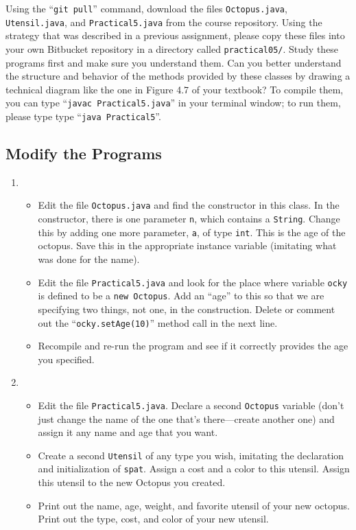 \begin{sloppypar}
Using the ``{\tt git pull}'' command, download the files {\tt Octopus.java}, {\tt Utensil.java}, and {\tt Practical5.java}
from the course repository. Using the strategy that was described in a previous assignment, please copy these files into
your own Bitbucket repository in a directory called {\tt practical05/}. Study these programs first and make sure you
understand them. Can you better understand the structure and behavior of the methods provided by these classes by
drawing a technical diagram like the one in Figure 4.7 of your textbook? To compile them, you can type ``{\tt javac
  Practical5.java}'' in your terminal window; to run them, please type type ``{\tt java Practical5}''.
\end{sloppypar}

\vspace*{-.15in}
\subsection*{Modify the Programs} 
\vspace*{-.05in}
\begin{enumerate}
\item 
\begin{itemize}
\item 
Edit the file {\tt Octopus.java} and find the constructor in this class. In the constructor,
there is one parameter {\tt n}, which contains a {\tt String}. 
Change this by adding one more parameter, {\tt a}, of type {\tt int}.
This is the age of the octopus. Save this in the appropriate instance
variable (imitating what was done for the name). 
\item 
\noindent Edit the file {\tt Practical5.java} and look for the place where variable
{\tt ocky} is defined to be a {\tt new Octopus}. Add an ``age'' to this
so that we are specifying two things, not one, in the construction.
Delete or comment out the ``{\tt ocky.setAge(10)}'' method call in the next line. 
\item 
\noindent Recompile and re-run the program and see if it correctly provides the age
you specified.
\end{itemize} \newpage
\item 
\begin{itemize}
\item
Edit the file {\tt Practical5.java}. Declare a second {\tt Octopus} variable (don't
just change the name of the one that's there---create another one) and
assign it any name and age that you want. 
\item
\noindent Create a second {\tt Utensil} of any type you wish, imitating the declaration and
initialization of {\tt spat}.
Assign a cost and a color to this utensil. Assign this utensil to the new
Octopus you created. 
\item
\noindent Print out the name, age, weight, and favorite utensil of your new octopus.
Print out the type, cost, and color of your new utensil.
\end{itemize}
\end{enumerate}

